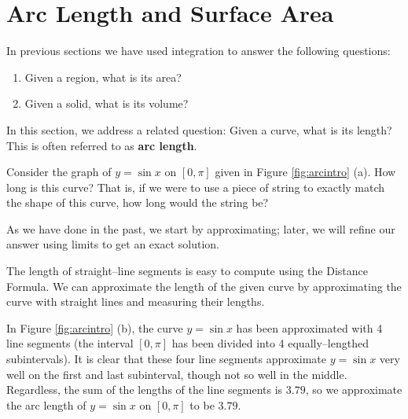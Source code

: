\section{Arc Length and Surface Area}\label{sec:arc_length}

In previous sections we have used integration to answer the following questions:
	\begin{enumerate}
	\item		Given a region, what is its area?
	\item		Given a solid, what is its volume?
	\end{enumerate}
	
In this section, we address a related question: Given a curve, what is its length? This is often referred to as \textbf{arc length}. 

Consider the graph of $y=\sin x$ on $[0,\pi]$ given in Figure \ref{fig:arcintro} (a). How long is this curve? That is, if we were to use a piece of string to exactly match the shape of this curve, how long would the string be?

As we have done in the past, we start by approximating; later, we will refine our answer using limits to get an exact solution.

The length of straight--line segments is easy to compute using the Distance Formula. We can approximate the length of the given curve by approximating the curve with straight lines and measuring their lengths. 

In Figure \ref{fig:arcintro} (b), the curve $y=\sin x$ has been approximated with 4 line segments (the interval $[0,\pi]$ has been divided into 4 equally--lengthed subintervals). It is clear that these four line segments approximate $y=\sin x$ very well on the first and last subinterval, though not so well in the middle. Regardless, the sum of the lengths of the line segments is $3.79$, so we approximate the arc length of $y=\sin x$ on $[0,\pi]$ to be $3.79$. 

